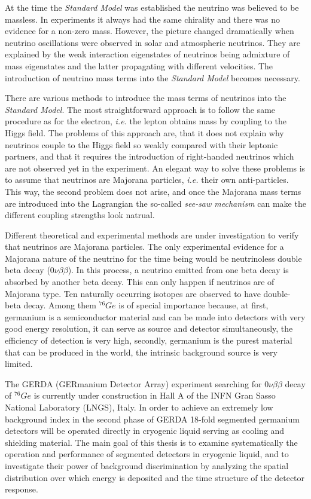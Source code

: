 At the time the \emph{Standard Model} was established the neutrino was
believed to be massless. In experiments it always had the same
chirality and there was no evidence for a non-zero mass. However, the
picture changed dramatically when neutrino oscillations were observed
in solar and atmospheric neutrinos. They are explained by the weak
interaction eigenstates of neutrinos being admixture of mass
eigenstates and the latter propagating with different velocities. The
introduction of neutrino mass terms into the \emph{Standard Model}
becomes necessary.

There are various methods to introduce the mass terms of neutrinos
into the \emph{Standard Model}. The most straightforward approach is
to follow the same procedure as for the electron, \textit{i.e.} the
lepton obtains mass by coupling to the Higgs field. The problems of
this approach are, that it does not explain why neutrinos couple to
the Higgs field so weakly compared with their leptonic partners, and
that it requires the introduction of right-handed neutrinos which are
not observed yet in the experiment. An elegant way to solve these
problems is to assume that neutrinos are Majorana particles,
\textit{i.e.} their own anti-particles. This way, the second problem
does not arise, and once the Majorana mass terms are introduced into
the Lagrangian the so-called \emph{see-saw mechanism} can make the
different coupling strengths look natrual.

Different theoretical and experimental methods are under investigation to verify that neutrinos are Majorana particles. The only experimental evidence for a Majorana nature of the neutrino for the time being would be neutrinoless double beta decay ($0\nu\beta\beta$). In this process, a neutrino emitted from one beta decay is absorbed by another beta decay. This can only happen if neutrinos are of Majorana type. Ten naturally occurring isotopes are observed to have double-beta decay. Among them $^{76}Ge$ is of special importance because, at first, germanium is a semiconductor material and can be made into detectors with very good energy resolution, it can serve as source and detector simultaneously, the efficiency of detection is very high, secondly, germanium is the purest material that can be produced in the world, the intrinsic background source is very limited.

The GERDA (GERmanium Detector Array) experiment searching for
$0\nu\beta\beta$ decay of $^{76}Ge$ is currently under
construction in Hall A of the INFN Gran Sasso National Laboratory
(LNGS), Italy. In order to achieve an extremely low background index
in the second phase of GERDA 18-fold segmented germanium detectors
will be operated directly in cryogenic liquid serving as cooling and
shielding material. The main goal of this thesis is to examine
systematically the operation and performance of segmented detectors in
cryogenic liquid, and to investigate their power of background
discrimination by analyzing the spatial distribution over which energy
is deposited and the time structure of the detector response.

